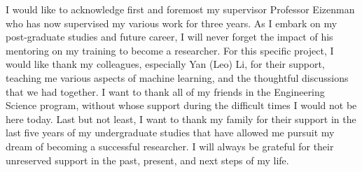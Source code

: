 \documentclass[onehalfspaced, 12pt, normalmargins]{ut-thesis}
\begin{document}
\begin{preliminary}
%



\begin{acknowledgements}
I would like to acknowledge first and foremost my supervisor Professor Eizenman who has now supervised my various work for three years. As I embark on my post-graduate studies and future career, I will never forget the impact of his mentoring on my training to become a researcher. For this specific project, I would like thank my colleagues, especially Yan (Leo) Li, for their support, teaching me various aspects of machine learning, and the thoughtful discussions that we had together. I want to thank all of my friends in the Engineering Science program, without whose support during the difficult times I would not be here today. Last but not least, I want to thank my family for their support in the last five years of my undergraduate studies that have allowed me pursuit my dream of becoming a successful researcher. I will always be grateful for their unreserved support in the past, present, and next steps of my life. 
\end{acknowledgements}

\tableofcontents

\listoftables


\end{preliminary}
\end{document}
